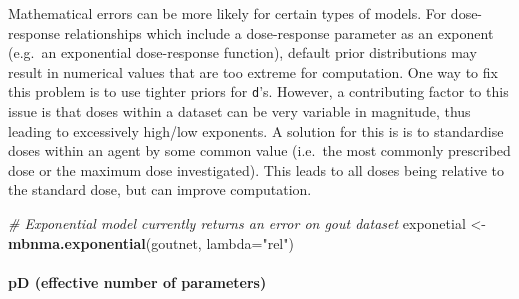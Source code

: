 \documentclass[]{article}
\newenvironment{Shaded}{\begin{snugshade}}{\end{snugshade}}
\newcommand{\CommentTok}[1]{\textcolor[rgb]{0.56,0.35,0.01}{\textit{#1}}}
\newcommand{\DataTypeTok}[1]{\textcolor[rgb]{0.13,0.29,0.53}{#1}}
\newcommand{\DecValTok}[1]{\textcolor[rgb]{0.00,0.00,0.81}{#1}}
\newcommand{\KeywordTok}[1]{\textcolor[rgb]{0.13,0.29,0.53}{\textbf{#1}}}
\newcommand{\NormalTok}[1]{#1}
\newcommand{\OperatorTok}[1]{\textcolor[rgb]{0.81,0.36,0.00}{\textbf{#1}}}
\newcommand{\StringTok}[1]{\textcolor[rgb]{0.31,0.60,0.02}{#1}}
\let\oldparagraph\paragraph
\renewcommand{\paragraph}[1]{\oldparagraph{#1}\mbox{}}
\begin{document}
Mathematical errors can be more likely for certain types of models. For
dose-response relationships which include a dose-response parameter as
an exponent (e.g.~an exponential dose-response function), default prior
distributions may result in numerical values that are too extreme for
computation. One way to fix this problem is to use tighter priors for
\texttt{d}'s. However, a contributing factor to this issue is that doses
within a dataset can be very variable in magnitude, thus leading to
excessively high/low exponents. A solution for this is is to standardise
doses within an agent by some common value (i.e.~the most commonly
prescribed dose or the maximum dose investigated). This leads to all
doses being relative to the standard dose, but can improve computation.

\begin{Shaded}
\begin{Highlighting}[]
\CommentTok{# Exponential model currently returns an error on gout dataset}
\NormalTok{exponetial <-}\StringTok{ }\KeywordTok{mbnma.exponential}\NormalTok{(goutnet, }\DataTypeTok{lambda=}\StringTok{"rel"}\NormalTok{)}
\end{Highlighting}
\end{Shaded}

\begin{Shaded}
\end{Shaded}

\hypertarget{pd-effective-number-of-parameters}{%
\paragraph{pD (effective number of
parameters)}\label{pd-effective-number-of-parameters}}
\end{document}
